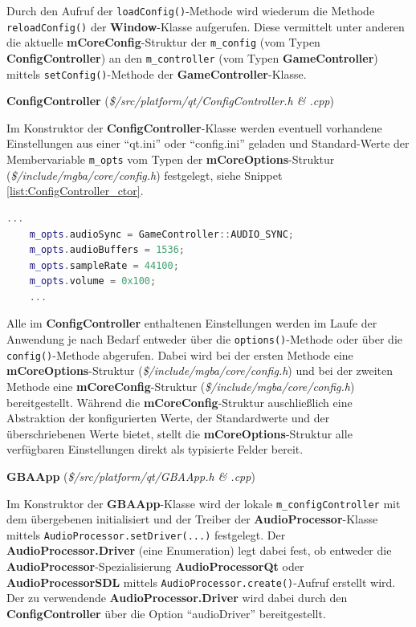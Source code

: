 \documentclass[11pt,a4paper]{scrartcl}
\newcommand{\paratitlecode}[2] {
    \vspace{5mm}
    \large \textbf{#1} \normalsize(\textit{\${#2}})
    \vspace{2mm}\newline
}
\begin{document}
Durch den Aufruf der \verb|loadConfig()|-Methode wird wiederum die Methode \verb|reloadConfig()| der \textbf{Window}-Klasse aufgerufen. Diese vermittelt unter anderen die aktuelle \textbf{mCoreConfig}-Struktur der \verb|m_config| (vom Typen \textbf{ConfigController}) an den \verb|m_controller| (vom Typen \textbf{GameController}) mittels \verb|setConfig()|-Methode der \textbf{GameController}-Klasse.

\paratitlecode{ConfigController}{/src/platform/qt/ConfigController.h \& .cpp}
Im Konstruktor der \textbf{ConfigController}-Klasse werden eventuell vorhandene Einstellungen aus einer \enquote{qt.ini} oder \enquote{config.ini} geladen und Standard-Werte der Membervariable \verb|m_opts| vom Typen der \textbf{mCoreOptions}-Struktur (\textit{\$/include/mgba/core/config.h}) festgelegt, siehe Snippet \ref{list:ConfigController_ctor}.

\vspace{5mm}
\begin{lstlisting}[language=C++, caption={Ausschnitt aus dem Konstruktor der ConfigController-Klasse}, label={list:ConfigController_ctor}]
    ...
	m_opts.audioSync = GameController::AUDIO_SYNC;
	m_opts.audioBuffers = 1536;
	m_opts.sampleRate = 44100;
	m_opts.volume = 0x100;
	...
\end{lstlisting}

Alle im \textbf{ConfigController} enthaltenen Einstellungen werden im Laufe der Anwendung je nach Bedarf entweder \"uber die \verb|options()|-Methode oder \"uber die \verb|config()|-Methode abgerufen. Dabei wird bei der ersten Methode eine \textbf{mCoreOptions}-Struktur (\textit{\$/include/mgba/core/config.h}) und bei der zweiten Methode eine \textbf{mCoreConfig}-Struktur (\textit{\$/include/mgba/core/config.h}) bereitgestellt. W\"ahrend die \textbf{mCoreConfig}-Struktur auschlie{\ss}lich eine Abstraktion der konfigurierten Werte, der Standardwerte und der \"uberschriebenen Werte bietet, stellt die \textbf{mCoreOptions}-Struktur alle verf\"ugbaren Einstellungen direkt als typisierte Felder bereit.

\paratitlecode{GBAApp}{/src/platform/qt/GBAApp.h \& .cpp}
Im Konstruktor der \textbf{GBAApp}-Klasse wird der lokale \verb|m_configController| mit dem \"ubergebenen initialisiert und der Treiber der \textbf{AudioProcessor}-Klasse mittels \verb|AudioProcessor.setDriver(...)| festgelegt. Der \textbf{AudioProcessor.Driver} (eine Enumeration) legt dabei fest, ob entweder die \textbf{AudioProcessor}-Spezialisierung \textbf{AudioProcessorQt} oder \textbf{AudioProcessorSDL} mittels \verb|AudioProcessor.create()|-Aufruf erstellt wird. Der zu verwendende \textbf{AudioProcessor.Driver} wird dabei durch den \textbf{ConfigController} \"uber die Option \enquote{audioDriver} bereitgestellt.
\end{document}
